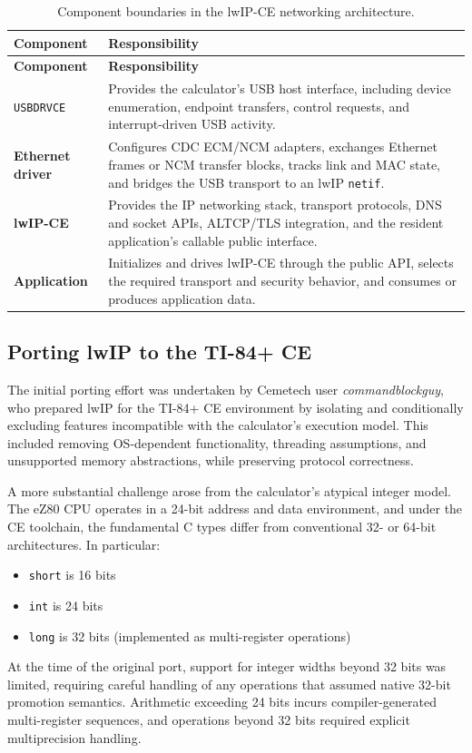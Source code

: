 \documentclass[titlepage]{report}
\begin{document}
\begin{xltabular}{\textwidth}{@{}>{\bfseries}p{0.20\textwidth}X@{}}
	\caption{Component boundaries in the lwIP-CE networking architecture.} \\
	\toprule
		\textbf{Component} & \textbf{Responsibility} \\
		\midrule
		\endfirsthead
		\toprule
		\textbf{Component} & \textbf{Responsibility} \\
		\midrule
		\endhead
		\bottomrule
		\endfoot

		\texttt{USBDRVCE} &
		Provides the calculator's USB host interface, including device enumeration,
		endpoint transfers, control requests, and interrupt-driven USB activity. \\

		Ethernet driver &
		Configures CDC ECM/NCM adapters, exchanges Ethernet frames or NCM transfer
		blocks, tracks link and MAC state, and bridges the USB transport to an lwIP
		\texttt{netif}. \\

		lwIP-CE &
		Provides the IP networking stack, transport protocols, DNS and socket APIs,
		ALTCP/TLS integration, and the resident application's callable public
		interface. \\

		Application &
		Initializes and drives lwIP-CE through the public API, selects the required
		transport and security behavior, and consumes or produces application data. \\

	\end{xltabular}
		
		
	\subsection{Porting lwIP to the TI-84+ CE}
		The initial porting effort was undertaken by Cemetech user \textit{commandblockguy}, who prepared lwIP for the TI-84+ CE environment by isolating and conditionally excluding features incompatible with the calculator’s execution model. This included removing OS-dependent functionality, threading assumptions, and unsupported memory abstractions, while preserving protocol correctness.
		
		A more substantial challenge arose from the calculator’s atypical integer model. The eZ80 CPU operates in a 24-bit address and data environment, and under the CE toolchain, the fundamental C types differ from conventional 32- or 64-bit architectures. In particular:
		\begin{itemize}
		\item \texttt{short} is 16 bits
		\item \texttt{int} is 24 bits
		\item \texttt{long} is 32 bits (implemented as multi-register operations)
		\end{itemize}
		At the time of the original port, support for integer widths beyond 32 bits was limited, requiring careful handling of any operations that assumed native 32-bit promotion semantics. Arithmetic exceeding 24 bits incurs compiler-generated multi-register sequences, and operations beyond 32 bits required explicit multiprecision handling.
		
\end{document}
